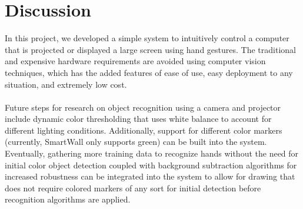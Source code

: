 \documentclass[twoside,twocolumn]{article}
\begin{document}





\section{Discussion}
In this project, we developed a simple system to intuitively control a computer that is projected or displayed a large screen using hand gestures. The traditional and expensive hardware requirements are avoided using computer vision techniques, which has the added features of ease of use, easy deployment to any situation, and extremely low cost.\\ \\ Future steps for research on object recognition using a camera and projector include dynamic color thresholding that uses white balance to account for different lighting conditions. Additionally, support for different color markers (currently, SmartWall only supports green) can be built into the system. Eventually, gathering more training data to recognize hands without the need for initial color object detection coupled with background subtraction algorithms for increased robustness can be integrated into the system to allow for drawing that does not require colored markers of any sort for initial detection before recognition algorithms are applied.\\

\end{document}
